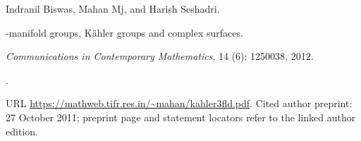 Indranil Biswas, Mahan Mj, and Harish Seshadri.

-manifold groups, {K\"ahler} groups and complex surfaces.

\newblock \emph{Communications in Contemporary Mathematics}, 14
  (6): 1250038, 2012.

\newblock {}.

\newblock URL \url{https://mathweb.tifr.res.in/~mahan/kahler3fld.pdf}.
\newblock Cited author preprint: 27 October 2011; preprint page and statement
locators refer to the linked author edition.

